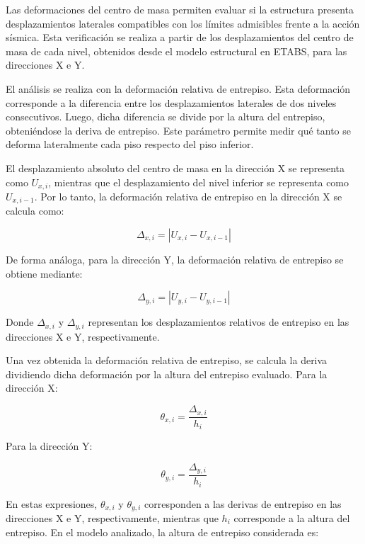 Las deformaciones del centro de masa permiten evaluar si la estructura presenta desplazamientos laterales compatibles con los límites admisibles frente a la acción sísmica. Esta verificación se realiza a partir de los desplazamientos del centro de masa de cada nivel, obtenidos desde el modelo estructural en ETABS, para las direcciones X e Y.

El análisis se realiza con la deformación relativa de entrepiso. Esta deformación corresponde a la diferencia entre los desplazamientos laterales de dos niveles consecutivos. Luego, dicha diferencia se divide por la altura del entrepiso, obteniéndose la deriva de entrepiso. Este parámetro permite medir qué tanto se deforma lateralmente cada piso respecto del piso inferior.

El desplazamiento absoluto del centro de masa en la dirección X se representa como $U_{x,i}$, mientras que el desplazamiento del nivel inferior se representa como $U_{x,i-1}$. Por lo tanto, la deformación relativa de entrepiso en la dirección X se calcula como:

\begin{equation}
\Delta_{x,i} = \left| U_{x,i} - U_{x,i-1} \right|
\end{equation}

De forma análoga, para la dirección Y, la deformación relativa de entrepiso se obtiene mediante:

\begin{equation}
\Delta_{y,i} = \left| U_{y,i} - U_{y,i-1} \right|
\end{equation}

Donde $\Delta_{x,i}$ y $\Delta_{y,i}$ representan los desplazamientos relativos de entrepiso en las direcciones X e Y, respectivamente.

Una vez obtenida la deformación relativa de entrepiso, se calcula la deriva dividiendo dicha deformación por la altura del entrepiso evaluado. Para la dirección X:

\begin{equation}
\theta_{x,i} = \frac{\Delta_{x,i}}{h_i}
\end{equation}

Para la dirección Y:

\begin{equation}
\theta_{y,i} = \frac{\Delta_{y,i}}{h_i}
\end{equation}

En estas expresiones, $\theta_{x,i}$ y $\theta_{y,i}$ corresponden a las derivas de entrepiso en las direcciones X e Y, respectivamente, mientras que $h_i$ corresponde a la altura del entrepiso. En el modelo analizado, la altura de entrepiso considerada es:

